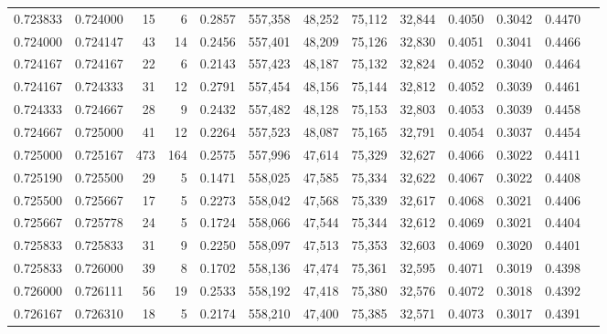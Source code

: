 \begin{tabular}{rrrrrrrrrrrrr}
0.723833 & 0.724000 &    15 &   6 &                                     0.2857 & 557,358 &  48,252 &  75,112 &  32,844 & 0.4050 & 0.3042 & 0.4470 \\
0.724000 & 0.724147 &    43 &  14 &                                     0.2456 & 557,401 &  48,209 &  75,126 &  32,830 & 0.4051 & 0.3041 & 0.4466 \\
0.724167 & 0.724167 &    22 &   6 &                                     0.2143 & 557,423 &  48,187 &  75,132 &  32,824 & 0.4052 & 0.3040 & 0.4464 \\
0.724167 & 0.724333 &    31 &  12 &                                     0.2791 & 557,454 &  48,156 &  75,144 &  32,812 & 0.4052 & 0.3039 & 0.4461 \\
0.724333 & 0.724667 &    28 &   9 &                                     0.2432 & 557,482 &  48,128 &  75,153 &  32,803 & 0.4053 & 0.3039 & 0.4458 \\
0.724667 & 0.725000 &    41 &  12 &                                     0.2264 & 557,523 &  48,087 &  75,165 &  32,791 & 0.4054 & 0.3037 & 0.4454 \\
0.725000 & 0.725167 &   473 & 164 &                                     0.2575 & 557,996 &  47,614 &  75,329 &  32,627 & 0.4066 & 0.3022 & 0.4411 \\
0.725190 & 0.725500 &    29 &   5 &                                     0.1471 & 558,025 &  47,585 &  75,334 &  32,622 & 0.4067 & 0.3022 & 0.4408 \\
0.725500 & 0.725667 &    17 &   5 &                                     0.2273 & 558,042 &  47,568 &  75,339 &  32,617 & 0.4068 & 0.3021 & 0.4406 \\
0.725667 & 0.725778 &    24 &   5 &                                     0.1724 & 558,066 &  47,544 &  75,344 &  32,612 & 0.4069 & 0.3021 & 0.4404 \\
0.725833 & 0.725833 &    31 &   9 &                                     0.2250 & 558,097 &  47,513 &  75,353 &  32,603 & 0.4069 & 0.3020 & 0.4401 \\
0.725833 & 0.726000 &    39 &   8 &                                     0.1702 & 558,136 &  47,474 &  75,361 &  32,595 & 0.4071 & 0.3019 & 0.4398 \\
0.726000 & 0.726111 &    56 &  19 &                                     0.2533 & 558,192 &  47,418 &  75,380 &  32,576 & 0.4072 & 0.3018 & 0.4392 \\
0.726167 & 0.726310 &    18 &   5 &                                     0.2174 & 558,210 &  47,400 &  75,385 &  32,571 & 0.4073 & 0.3017 & 0.4391 \\

\end{tabular}
